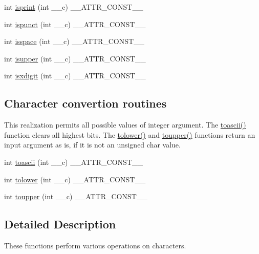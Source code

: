 \begin{DoxyCompactItemize}
\item 
int \hyperlink{group__ctype_ga7d57debe23df28bf225dc8972b5c3667}{isprint} (int \+\_\+\+\_\+c) \+\_\+\+\_\+\+A\+T\+T\+R\+\_\+\+C\+O\+N\+S\+T\+\_\+\+\_\+
\item 
int \hyperlink{group__ctype_ga289e7ad4e56ddb01c40c5e36893d4e15}{ispunct} (int \+\_\+\+\_\+c) \+\_\+\+\_\+\+A\+T\+T\+R\+\_\+\+C\+O\+N\+S\+T\+\_\+\+\_\+
\item 
int \hyperlink{group__ctype_gac83050abd09696d505838d772b910b37}{isspace} (int \+\_\+\+\_\+c) \+\_\+\+\_\+\+A\+T\+T\+R\+\_\+\+C\+O\+N\+S\+T\+\_\+\+\_\+
\item 
int \hyperlink{group__ctype_gacf51dfd9a4ffe74117818cf7a4ab6600}{isupper} (int \+\_\+\+\_\+c) \+\_\+\+\_\+\+A\+T\+T\+R\+\_\+\+C\+O\+N\+S\+T\+\_\+\+\_\+
\item 
int \hyperlink{group__ctype_gacd4734333ae16e853e0ffb4db4a96ba7}{isxdigit} (int \+\_\+\+\_\+c) \+\_\+\+\_\+\+A\+T\+T\+R\+\_\+\+C\+O\+N\+S\+T\+\_\+\+\_\+
\end{DoxyCompactItemize}
\subsection*{Character convertion routines}
\label{_amgrp4d241bbe011b857da7f54c9d3d4edf40}%
This realization permits all possible values of integer argument. The \hyperlink{group__ctype_ga4a0c9dbccb29e29684958d68aa021e8a}{toascii()} function clears all highest bits. The \hyperlink{group__ctype_gad0cebcf69817481a96ee98b4e801edb5}{tolower()} and \hyperlink{group__ctype_ga3f6d808c2e5205a500cf573dfc698c75}{toupper()} functions return an input argument as is, if it is not an unsigned char value. \begin{DoxyCompactItemize}
\item 
int \hyperlink{group__ctype_ga4a0c9dbccb29e29684958d68aa021e8a}{toascii} (int \+\_\+\+\_\+c) \+\_\+\+\_\+\+A\+T\+T\+R\+\_\+\+C\+O\+N\+S\+T\+\_\+\+\_\+
\item 
int \hyperlink{group__ctype_gad0cebcf69817481a96ee98b4e801edb5}{tolower} (int \+\_\+\+\_\+c) \+\_\+\+\_\+\+A\+T\+T\+R\+\_\+\+C\+O\+N\+S\+T\+\_\+\+\_\+
\item 
int \hyperlink{group__ctype_ga3f6d808c2e5205a500cf573dfc698c75}{toupper} (int \+\_\+\+\_\+c) \+\_\+\+\_\+\+A\+T\+T\+R\+\_\+\+C\+O\+N\+S\+T\+\_\+\+\_\+
\end{DoxyCompactItemize}


\subsection{Detailed Description}
These functions perform various operations on characters.


